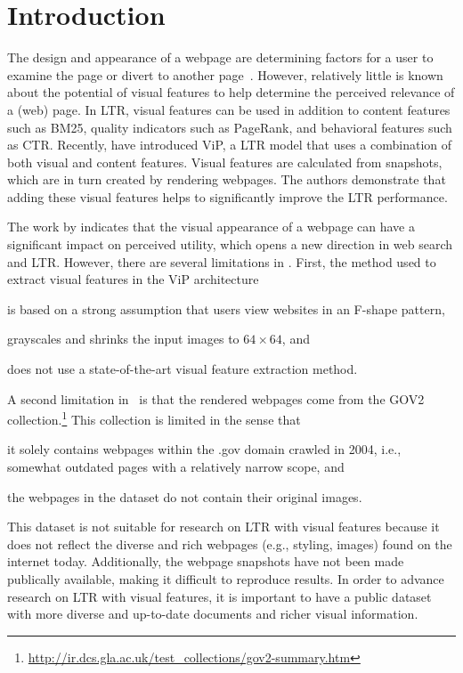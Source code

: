 
\section{Introduction}
The design and appearance of a webpage are determining factors for a user to examine the page or divert to another page~\cite{nielsen1999designing,nielsen2006f,pernice2017f,wang2014eye}.
However, relatively little is known about the potential of visual features to help determine the perceived relevance of a (web) page. In \acf{LTR}, visual features can be used in addition to content features such as BM25, quality indicators such as PageRank, and behavioral features such as CTR.
Recently, \citet{fan2017learning} have introduced ViP, a \ac{LTR} model that uses a combination of both visual and content features.
Visual features are calculated from snapshots, which are in turn created by rendering webpages.
The authors demonstrate that adding these visual features helps to significantly improve the \ac{LTR} performance.

The work by \citet{fan2017learning} indicates that the visual appearance of a webpage can have a significant impact on perceived utility, which opens a new direction in web search and \ac{LTR}.
However, there are several limitations in \cite{fan2017learning}.
First, the method used to extract visual features in the ViP architecture
\begin{inparaenum}[(i)]
\item is based on a strong assumption that users view websites in an F-shape pattern, 
\item grayscales and shrinks the input images to $64\times64$, and
\item does not use a state-of-the-art visual feature extraction method.
\end{inparaenum}

A second limitation in~\citep{fan2017learning} is that
the rendered webpages come from the GOV2 collection.\footnote{\url{http://ir.dcs.gla.ac.uk/test_collections/gov2-summary.htm}}
This collection is limited in the sense that 
\begin{inparaenum}[(i)]
\item it solely contains webpages within the .gov domain crawled in 2004, i.e., somewhat outdated pages with a relatively narrow scope, and
\item the webpages in the dataset do not contain their original images.
\end{inparaenum}
This dataset is not suitable for research on \ac{LTR} with visual features because it does not reflect the diverse and rich webpages (e.g., styling, images) found on the internet today. 
Additionally, the webpage snapshots have not been made publically available, making it difficult to reproduce results. 
In order to advance research on \ac{LTR} with visual features, it is important to have a public dataset with more diverse and up-to-date documents and richer visual information.


